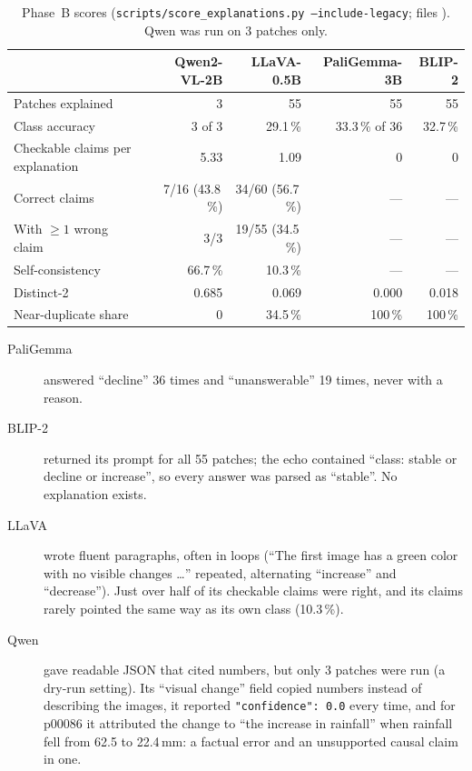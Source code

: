 \begin{table}[H]
\centering
\caption{Phase~B scores (\texttt{scripts/score\_explanations.py --include-legacy}; files ). Qwen was run on 3 patches only.}
\label{tab:phaseB}
\small
\begin{tabular}{lrrrr}
\toprule
 & Qwen2-VL-2B & LLaVA-0.5B & PaliGemma-3B & BLIP-2 \\
\midrule
Patches explained & 3 & 55 & 55 & 55 \\
Class accuracy & 3 of 3 & 29.1\,\% & 33.3\,\% of 36 & 32.7\,\% \\
Checkable claims per explanation & 5.33 & 1.09 & 0 & 0 \\
Correct claims & 7/16 (43.8\,\%) & 34/60 (56.7\,\%) & --- & --- \\
With $\ge 1$ wrong claim & 3/3 & 19/55 (34.5\,\%) & --- & --- \\
Self-consistency & 66.7\,\% & 10.3\,\% & --- & --- \\
Distinct-2 & 0.685 & 0.069 & 0.000 & 0.018 \\
Near-duplicate share & 0 & 34.5\,\% & 100\,\% & 100\,\% \\
\bottomrule
\end{tabular}
\end{table}

\begin{description}
  \item[PaliGemma] answered ``decline'' 36 times and ``unanswerable'' 19 times, never with a reason.
  \item[BLIP-2] returned its prompt for all 55 patches; the echo contained ``class: stable or decline or increase'', so every answer was parsed as ``stable''. No explanation exists.
  \item[LLaVA] wrote fluent paragraphs, often in loops (``The first image has a green color with no visible changes \dots'' repeated, alternating ``increase'' and ``decrease''). Just over half of its checkable claims were right, and its claims rarely pointed the same way as its own class (10.3\,\%).
  \item[Qwen] gave readable JSON that cited numbers, but only 3 patches were run (a dry-run setting). Its ``visual change'' field copied numbers instead of describing the images, it reported \texttt{"confidence": 0.0} every time, and for p00086 it attributed the change to ``the increase in rainfall'' when rainfall fell from 62.5 to 22.4\,mm: a factual error and an unsupported causal claim in one.
\end{description}


